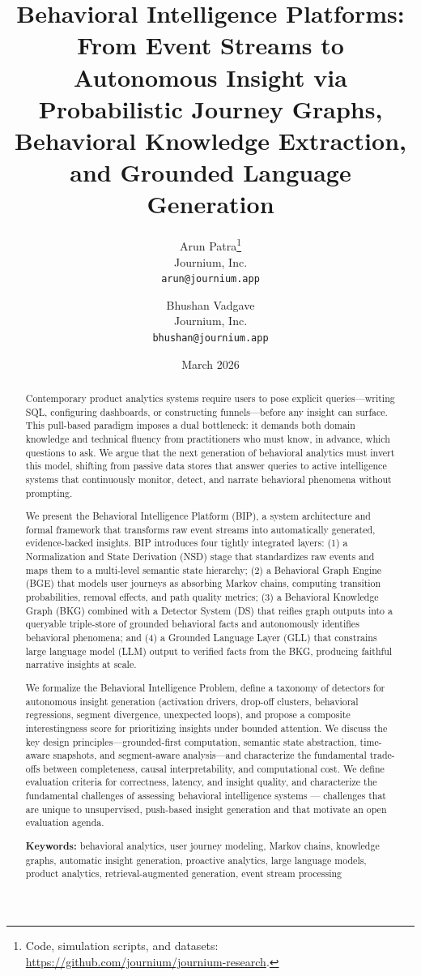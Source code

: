 \documentclass[12pt, a4paper]{article}
\title{\textbf{Behavioral Intelligence Platforms:}\\
\large From Event Streams to Autonomous Insight via\\
Probabilistic Journey Graphs, Behavioral Knowledge Extraction,\\
and Grounded Language Generation}
\author{%
  Arun Patra\thanks{Code, simulation scripts, and datasets:
    \url{https://github.com/journium/journium-research}.} \\
  \normalsize Journium, Inc. \\
  \normalsize \texttt{arun@journium.app}
  \and
  Bhushan Vadgave \\
  \normalsize Journium, Inc. \\
  \normalsize \texttt{bhushan@journium.app}
}
\date{March 2026}
\begin{document}
\maketitle

\begin{abstract}
Contemporary product analytics systems require users to pose explicit queries---writing SQL, configuring dashboards, or constructing funnels---before any insight can surface. This pull-based paradigm imposes a dual bottleneck: it demands both domain knowledge and technical fluency from practitioners who must know, in advance, which questions to ask. We argue that the next generation of behavioral analytics must invert this model, shifting from passive data stores that answer queries to active intelligence systems that continuously monitor, detect, and narrate behavioral phenomena without prompting.

We present the Behavioral Intelligence Platform (BIP), a system architecture and formal framework that transforms raw event streams into automatically generated, evidence-backed insights. BIP introduces four tightly integrated layers: (1) a Normalization and State Derivation (NSD) stage that standardizes raw events and maps them to a multi-level semantic state hierarchy; (2) a Behavioral Graph Engine (BGE) that models user journeys as absorbing Markov chains, computing transition probabilities, removal effects, and path quality metrics; (3) a Behavioral Knowledge Graph (BKG) combined with a Detector System (DS) that reifies graph outputs into a queryable triple-store of grounded behavioral facts and autonomously identifies behavioral phenomena; and (4) a Grounded Language Layer (GLL) that constrains large language model (LLM) output to verified facts from the BKG, producing faithful narrative insights at scale.

We formalize the Behavioral Intelligence Problem, define a taxonomy of detectors for autonomous insight generation (activation drivers, drop-off clusters, behavioral regressions, segment divergence, unexpected loops), and propose a composite interestingness score for prioritizing insights under bounded attention. We discuss the key design principles---grounded-first computation, semantic state abstraction, time-aware snapshots, and segment-aware analysis---and characterize the fundamental trade-offs between completeness, causal interpretability, and computational cost. We define evaluation criteria for correctness, latency, and insight quality, and characterize the fundamental challenges of assessing behavioral intelligence systems --- challenges that are unique to unsupervised, push-based insight generation and that motivate an open evaluation agenda.

\textbf{Keywords:} behavioral analytics, user journey modeling, Markov chains, knowledge graphs, automatic insight generation, proactive analytics, large language models, product analytics, retrieval-augmented generation, event stream processing
\end{abstract}
\end{document}
